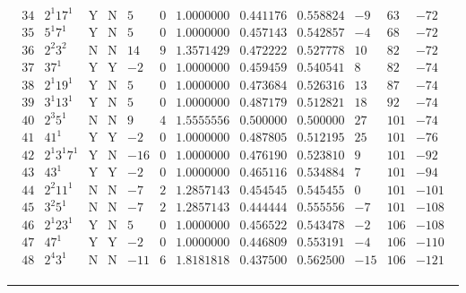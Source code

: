 \documentclass[11pt,reqno,a4letter]{article}
\numberwithin{figure}{section}
\numberwithin{table}{section}
\theoremstyle{plain}
\numberwithin{theorem}{section}
\theoremstyle{definition}
\begin{document}
\begin{table}[h!]
\begin{equation*}
{\begin{array}{cc|cc|ccc|cc|ccc}
 34 & 2^1 17^1 & \text{Y} & \text{N} & 5 & 0 & 1.0000000 & 0.441176 & 0.558824 & -9 & 63 & -72 \\
 35 & 5^1 7^1 & \text{Y} & \text{N} & 5 & 0 & 1.0000000 & 0.457143 & 0.542857 & -4 & 68 & -72 \\
 36 & 2^2 3^2 & \text{N} & \text{N} & 14 & 9 & 1.3571429 & 0.472222 & 0.527778 & 10 & 82 & -72 \\
 37 & 37^1 & \text{Y} & \text{Y} & -2 & 0 & 1.0000000 & 0.459459 & 0.540541 & 8 & 82 & -74 \\
 38 & 2^1 19^1 & \text{Y} & \text{N} & 5 & 0 & 1.0000000 & 0.473684 & 0.526316 & 13 & 87 & -74 \\
 39 & 3^1 13^1 & \text{Y} & \text{N} & 5 & 0 & 1.0000000 & 0.487179 & 0.512821 & 18 & 92 & -74 \\
 40 & 2^3 5^1 & \text{N} & \text{N} & 9 & 4 & 1.5555556 & 0.500000 & 0.500000 & 27 & 101 & -74 \\
 41 & 41^1 & \text{Y} & \text{Y} & -2 & 0 & 1.0000000 & 0.487805 & 0.512195 & 25 & 101 & -76 \\
 42 & 2^1 3^1 7^1 & \text{Y} & \text{N} & -16 & 0 & 1.0000000 & 0.476190 & 0.523810 & 9 & 101 & -92 \\
 43 & 43^1 & \text{Y} & \text{Y} & -2 & 0 & 1.0000000 & 0.465116 & 0.534884 & 7 & 101 & -94 \\
 44 & 2^2 11^1 & \text{N} & \text{N} & -7 & 2 & 1.2857143 & 0.454545 & 0.545455 & 0 & 101 & -101 \\
 45 & 3^2 5^1 & \text{N} & \text{N} & -7 & 2 & 1.2857143 & 0.444444 & 0.555556 & -7 & 101 & -108 \\
 46 & 2^1 23^1 & \text{Y} & \text{N} & 5 & 0 & 1.0000000 & 0.456522 & 0.543478 & -2 & 106 & -108 \\
 47 & 47^1 & \text{Y} & \text{Y} & -2 & 0 & 1.0000000 & 0.446809 & 0.553191 & -4 & 106 & -110 \\
 48 & 2^4 3^1 & \text{N} & \text{N} & -11 & 6 & 1.8181818 & 0.437500 & 0.562500 & -15 & 106 & -121 \\ 
\end{array}
}
\end{equation*}

\bigskip\hrule\smallskip 


\end{table}
\end{document}

